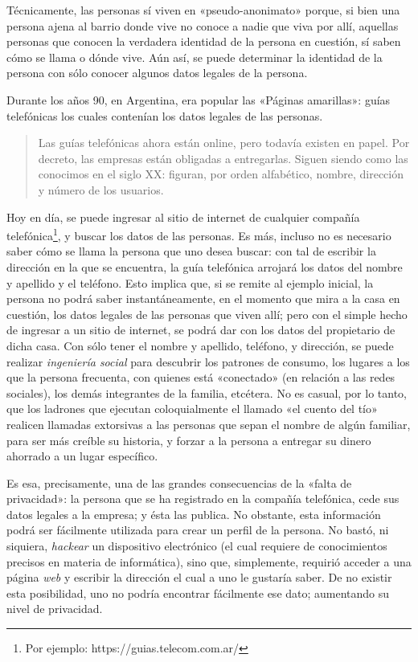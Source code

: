 \documentclass[12pt,a4paper,twoside]{book}
\begin{document}
Técnicamente, las personas sí viven en «pseudo-anonimato» porque, si bien una persona ajena al barrio donde vive no conoce a nadie que viva por allí, aquellas personas que conocen la verdadera identidad de la persona en cuestión, sí saben cómo se llama o dónde vive. Aún así, se puede determinar la identidad de la persona con sólo conocer algunos datos legales de la persona. 

Durante los años 90, en Argentina, era popular las «Páginas amarillas»: guías telefónicas los cuales contenían los datos legales de las personas.

\begin{quotation}
Las guías telefónicas ahora están online, pero todavía existen en papel. Por decreto, las empresas están obligadas a entregarlas. Siguen siendo como las conocimos en el siglo XX: figuran, por orden alfabético, nombre, dirección y número de los usuarios. \cite{lanacion:guitatelefonica}
\end{quotation}

Hoy en día, se puede ingresar al sitio de internet de cualquier compañía telefónica\footnote{Por ejemplo: https://guias.telecom.com.ar/}, y buscar los datos de las personas. Es más, incluso no es necesario saber cómo se llama la persona que uno desea buscar: con tal de escribir la dirección en la que se encuentra, la guía telefónica arrojará los datos del nombre y apellido y el teléfono. Esto implica que, si se remite al ejemplo inicial, la persona no podrá saber instantáneamente, en el momento que mira a la casa en cuestión, los datos legales de las personas que viven allí; pero con el simple hecho de ingresar a un sitio de internet, se podrá dar con los datos del propietario de dicha casa. Con sólo tener el nombre y apellido, teléfono, y dirección, se puede realizar \textit{ingeniería social} para descubrir los patrones de consumo, los lugares a los que la persona frecuenta, con quienes está «conectado» (en relación a las redes sociales), los demás integrantes de la familia, etcétera. No es casual, por lo tanto, que los ladrones que ejecutan coloquialmente el llamado «el cuento del tío» realicen llamadas extorsivas a las personas que sepan el nombre de algún familiar, para ser más creíble su historia, y forzar a la persona a entregar su dinero ahorrado a un lugar específico.

Es esa, precisamente, una de las grandes consecuencias de la «falta de privacidad»: la persona que se ha registrado en la compañía telefónica, cede sus datos legales a la empresa; y ésta las publica. No obstante, esta información podrá ser fácilmente utilizada para crear un perfil de la persona. No bastó, ni siquiera, \textit{hackear} un dispositivo electrónico (el cual requiere de conocimientos precisos en materia de informática), sino que, simplemente, requirió acceder a una página \textit{web} y escribir la dirección el cual a uno le gustaría saber. De no existir esta posibilidad, uno no podría encontrar fácilmente ese dato; aumentando su nivel de privacidad.
\end{document}
